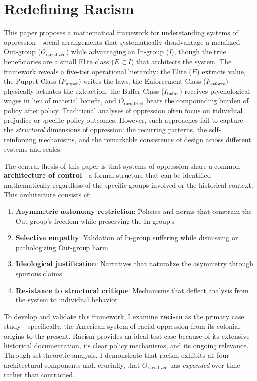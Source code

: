 \documentclass[12pt,openany]{book}
\begin{document}
\chapter{Redefining Racism}

This paper proposes a mathematical framework for understanding systems of oppression---social arrangements that systematically disadvantage a racialized Out-group ($O_{\text{racialized}}$) while advantaging an In-group ($I$), though the true beneficiaries are a small Elite class ($E \subset I$) that architects the system. The framework reveals a five-tier operational hierarchy: the Elite ($E$) extracts value, the Puppet Class ($P_{\text{uppet}}$) writes the laws, the Enforcement Class ($F_{\text{enforce}}$) physically actuates the extraction, the Buffer Class ($I_{\text{buffer}}$) receives psychological wages in lieu of material benefit, and $O_{\text{racialized}}$ bears the compounding burden of policy after policy. Traditional analyses of oppression often focus on individual prejudice or specific policy outcomes. However, such approaches fail to capture the \textit{structural} dimensions of oppression: the recurring patterns, the self-reinforcing mechanisms, and the remarkable consistency of design across different systems and scales.

The central thesis of this paper is that systems of oppression share a common \textbf{architecture of control}---a formal structure that can be identified mathematically regardless of the specific groups involved or the historical context. This architecture consists of:
\begin{enumerate}
    \item \textbf{Asymmetric autonomy restriction}: Policies and norms that constrain the Out-group's freedom while preserving the In-group's
    \item \textbf{Selective empathy}: Validation of In-group suffering while dismissing or pathologizing Out-group harm
    \item \textbf{Ideological justification}: Narratives that naturalize the asymmetry through spurious claims
    \item \textbf{Resistance to structural critique}: Mechanisms that deflect analysis from the system to individual behavior
\end{enumerate}

To develop and validate this framework, I examine \textbf{racism} as the primary case study---specifically, the American system of racial oppression from its colonial origins to the present. Racism provides an ideal test case because of its extensive historical documentation, its clear policy mechanisms, and its ongoing relevance. Through set-theoretic analysis, I demonstrate that racism exhibits all four architectural components and, crucially, that $O_{\text{racialized}}$ has \textit{expanded} over time rather than contracted.
\end{document}
